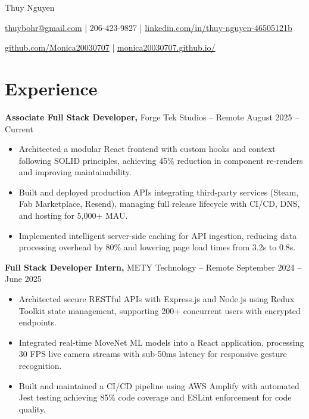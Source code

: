 \documentclass[11pt]{article}       %
\begin{document}
\centerline{\Huge Thuy Nguyen}

\vspace{5pt}

\centerline{\href{mailto:thuybohr@gmail.com}{thuybohr@gmail.com} | 206-423-9827 |
\href{https://www.linkedin.com/in/thuy-nguyen-46505121b/}{linkedin.com/in/thuy-nguyen-46505121b}}

\centerline{\href{https://github.com/Monica20030707}{github.com/Monica20030707} | 
\href{https://monica20030707.github.io/}{monica20030707.github.io/}} 

\vspace{-9pt}

\section*{Experience}

\textbf{Associate Full Stack Developer,} {Forge Tek Studios} -- Remote \hfill August 2025 -- Current 
\vspace{-9pt}
\begin{itemize}
  \item Architected a modular React frontend with custom hooks and context following SOLID principles, achieving 45\% reduction in component re-renders and improving maintainability.
  \item Built and deployed production APIs integrating third-party services (Steam, Fab Marketplace, Resend), managing full release lifecycle with CI/CD, DNS, and hosting for 5,000+ MAU.
  \item Implemented intelligent server-side caching for API ingestion, reducing data processing overhead by 80\% and lowering page load times from 3.2s to 0.8s.
\end{itemize}

\textbf{Full Stack Developer Intern,} {METY Technology} -- Remote \hfill September 2024 -- June 2025 
\vspace{-9pt}
\begin{itemize}
  \item Architected secure RESTful APIs with Express.js and Node.js using Redux Toolkit state management, supporting 200+ concurrent users with encrypted endpoints.
  \item Integrated real-time MoveNet ML models into a React application, processing 30 FPS live camera streams with sub-50ms latency for responsive gesture recognition.
  \item Built and maintained a CI/CD pipeline using AWS Amplify with automated Jest testing achieving 85\% code coverage and ESLint enforcement for code quality.
\end{itemize}
\end{document}

